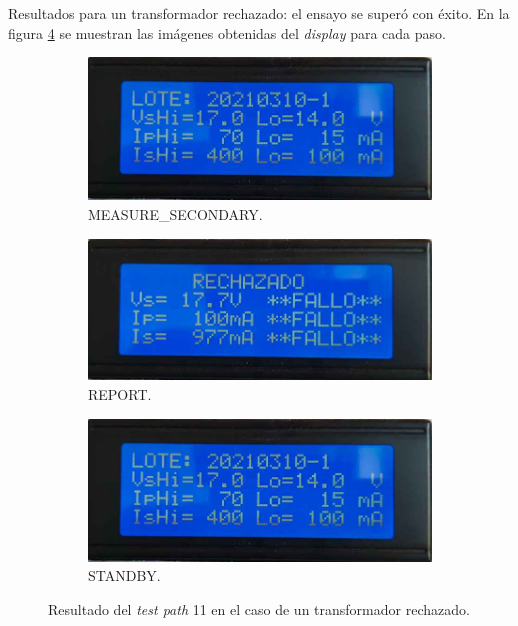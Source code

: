 Resultados para un transformador rechazado: el ensayo se superó con éxito. En la figura \ref{fig:pruConf_11_res_a} se muestran las imágenes obtenidas del \textit{display} para cada paso.

\begin{figure}[!htpb]
     \centering
     \begin{subfigure}[b]{0.4\textwidth}
         \centering
         \includegraphics[width=1.1\textwidth]{./Figures/pru_fail.jpeg}
         \caption{MEASURE\_SECONDARY.}
         \label{fig:pruConf_11_1_a}
     \end{subfigure}
          \hfill
     \begin{subfigure}[b]{0.4\textwidth}
         \centering
         \includegraphics[width=1.1\textwidth]{./Figures/rechazado.jpeg}
         \caption{REPORT.}
         \label{fig:pruConf_11_2_a}
     \end{subfigure}
           \hfill
     \begin{subfigure}[b]{0.4\textwidth}
         \centering
         \includegraphics[width=1.1\textwidth]{./Figures/pru_fail.jpeg}
         \caption{STANDBY.}
         \label{fig:pruConf_11_3_a}
     \end{subfigure}
        \caption{Resultado del \textit{test path} 11 en el caso de un transformador rechazado.}
        \label{fig:pruConf_11_res_a}
\end{figure}

